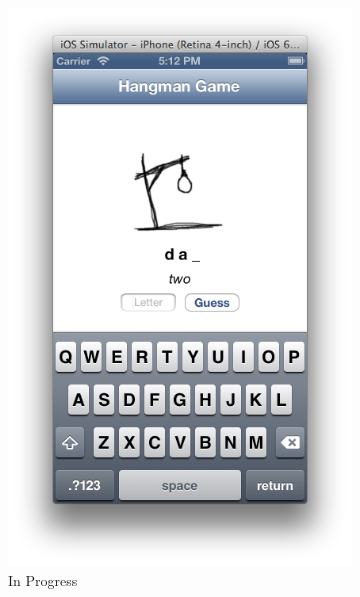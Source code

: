 \documentclass[11pt, a4paper]{article}
\begin{document}
\begin{figure}[h]
\begin{subfigure}[b]{0.3\textwidth}
\includegraphics[width=\textwidth]{img/hangman-prog}
\caption{In Progress}
\end{subfigure}
\\
\begin{subfigure}[b]{0.3\textwidth}

\end{subfigure}
\end{figure}
\end{document}
